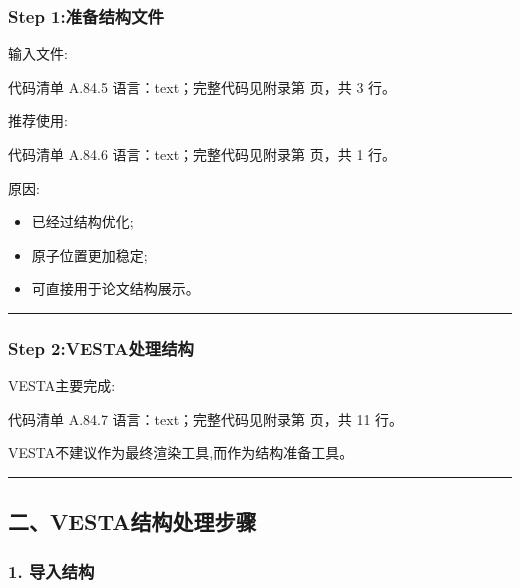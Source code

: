 \documentclass[lang=cn,scheme=chinese,color=blue,device=normal,toc=onecol,math=cm]{elegantbook}
\begin{document}
\subsubsection{Step 1:准备结构文件}


输入文件:\par


\begin{codeindexbox}{代码清单 A.84.5}
语言：text；完整代码见附录第 \pageref{code:84:5} 页，共 3 行。
\end{codeindexbox}


推荐使用:\par


\begin{codeindexbox}{代码清单 A.84.6}
语言：text；完整代码见附录第 \pageref{code:84:6} 页，共 1 行。
\end{codeindexbox}


原因:\par


\begin{itemize}
\item 已经过结构优化;
\item 原子位置更加稳定;
\item 可直接用于论文结构展示。
\end{itemize}


\medskip\hrule\medskip


\subsubsection{Step 2:VESTA处理结构}


VESTA主要完成:\par


\begin{codeindexbox}{代码清单 A.84.7}
语言：text；完整代码见附录第 \pageref{code:84:7} 页，共 11 行。
\end{codeindexbox}


VESTA不建议作为最终渲染工具,而作为结构准备工具。\par


\medskip\hrule\medskip


\subsection{二、VESTA结构处理步骤}


\subsubsection{1. 导入结构}
\end{document}
